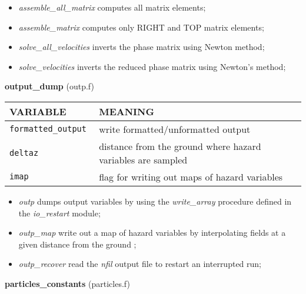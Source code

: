 \begin{itemize}
\item{\em assemble\_all\_matrix} computes all matrix elements;
\item{\em assemble\_matrix} computes only RIGHT and TOP matrix elements;
\item{\em solve\_all\_velocities} inverts the phase matrix using Newton method;
\item{\em solve\_velocities} inverts the reduced phase matrix using Newton's method;
\end{itemize}
%
%
{\large{\bf output\_dump}} (outp.f)\\[5mm]
\begin{tabular}{|p{6cm}|p{6cm}|}\hline
VARIABLE &  MEANING\\\hline
\tt  formatted\_output  & write formatted/unformatted output \\\hline
\tt  deltaz  & distance from the ground where hazard variables are sampled \\\hline
\tt  imap  & flag for writing out maps of hazard variables \\\hline
\end{tabular}
\begin{itemize}
\item{\em outp} dumps output variables by using the {\em write\_array} procedure defined in the {\em io\_restart}
 module;
\item{\em outp\_map} write out a map of hazard variables by interpolating fields at a given distance from the ground ;
\item{\em outp\_recover} read the {\em nfil} output file to restart an interrupted run;
\end{itemize}
%
%
{\large{\bf particles\_constants}} (particles.f)\\[5mm]
